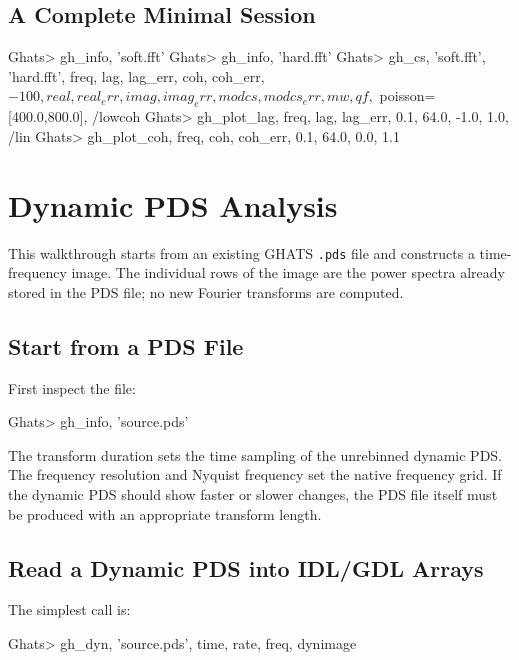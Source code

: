 \subsection*{A Complete Minimal Session}

\begin{ghatsconsole}
Ghats> gh_info, 'soft.fft'
Ghats> gh_info, 'hard.fft'
Ghats> gh_cs, 'soft.fft', 'hard.fft', freq, lag, lag_err, coh, coh_err, $
       -100, real, real_err, imag, imag_err, modcs, modcs_err, mw, qf, $
       poisson=[400.0,800.0], /lowcoh
Ghats> gh_plot_lag, freq, lag, lag_err, 0.1, 64.0, -1.0, 1.0, /lin
Ghats> gh_plot_coh, freq, coh, coh_err, 0.1, 64.0, 0.0, 1.1
\end{ghatsconsole}

\section{Dynamic PDS Analysis}

This walkthrough starts from an existing GHATS \texttt{.pds} file and
constructs a time-frequency image.  The individual rows of the image are the
power spectra already stored in the PDS file; no new Fourier transforms are
computed.

\subsection*{Start from a PDS File}

First inspect the file:

\begin{ghatsconsole}
Ghats> gh_info, 'source.pds'
\end{ghatsconsole}

The transform duration sets the time sampling of the unrebinned dynamic PDS.
The frequency resolution and Nyquist frequency set the native frequency grid.
If the dynamic PDS should show faster or slower changes, the PDS file itself
must be produced with an appropriate transform length.

\subsection*{Read a Dynamic PDS into IDL/GDL Arrays}

The simplest call is:

\begin{ghatsconsole}
Ghats> gh_dyn, 'source.pds', time, rate, freq, dynimage
\end{ghatsconsole}

